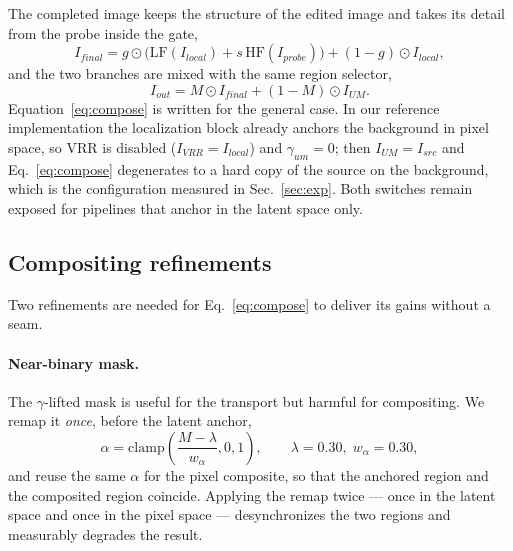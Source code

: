 \documentclass[10pt,twocolumn,letterpaper]{article}
\newcommand{\HF}{\mathrm{HF}}
\newcommand{\LF}{\mathrm{LF}}
\begin{document}
The completed image keeps the structure of the edited image and takes its detail
from the probe inside the gate,
\begin{equation}
  I_{final} = g\odot\bigl(\LF(I_{local}) + s\,\HF(I_{probe})\bigr)
            + (1-g)\odot I_{local},
  \label{eq:lfhf}
\end{equation}
and the two branches are mixed with the same region selector,
\begin{equation}
  I_{out} = M\odot I_{final} + (1-M)\odot I_{UM}.
  \label{eq:compose}
\end{equation}
Equation~\eqref{eq:compose} is written for the general case. In our reference
implementation the localization block already anchors the background in pixel
space, so VRR is disabled ($I_{VRR}=I_{local}$) and $\gamma_{um}=0$; then
$I_{UM}=I_{src}$ and Eq.~\eqref{eq:compose} degenerates to a hard copy of the
source on the background, which is the configuration measured in
Sec.~\ref{sec:exp}. Both switches remain exposed for pipelines that anchor in the
latent space only.

\subsection{Compositing refinements}
\label{sec:ece}

Two refinements are needed for Eq.~\eqref{eq:compose} to deliver its gains
without a seam.

\paragraph{Near-binary mask.} The $\gamma$-lifted mask is useful for the
transport but harmful for compositing. We remap it \emph{once}, before the latent
anchor,
\begin{equation}
  \alpha = \mathrm{clamp}\!\left(\frac{M-\lambda}{w_{\alpha}},0,1\right),
  \qquad \lambda=0.30,\; w_{\alpha}=0.30,
  \label{eq:remap}
\end{equation}
and reuse the same $\alpha$ for the pixel composite, so that the anchored region
and the composited region coincide. Applying the remap twice --- once in the
latent space and once in the pixel space --- desynchronizes the two regions and
measurably degrades the result.
\end{document}
